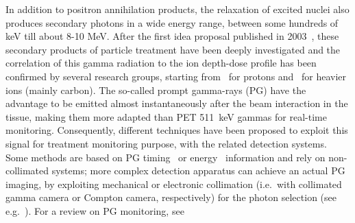 In addition to positron annihilation products, the relaxation of excited nuclei also produces secondary photons in a wide energy range, between some hundreds of keV till about 8-10 MeV. After the first idea proposal published in 2003~\cite{PG_first}, these secondary products of particle treatment have been deeply investigated and the correlation of this gamma radiation to the ion depth-dose profile has been confirmed by several research groups, starting from~\cite{Min_PG} for protons and~\cite{Testa_PG} for heavier ions (mainly carbon). The so-called prompt gamma-rays (PG) have the advantage to be emitted almost instantaneously after the beam interaction in the tissue, making them more adapted than PET 511~keV gammas for real-time monitoring. Consequently, different techniques have been proposed to exploit this signal for treatment monitoring purpose, with the related detection systems. Some methods are based on PG timing~\cite{Golnik:2014aa, Krimmer_PGPI} or energy~\cite{Verburg:2014aa} information and rely on non-collimated systems; more complex detection apparatus can achieve an actual PG imaging, by exploiting mechanical or electronic collimation (i.e.~with collimated gamma camera or Compton camera, respectively) for the photon selection (see e.g.~\cite{Min_PG, Bom_collimated, Smeets:2012aa, Roellinghoff_2014, Priegnitz:2015aa, Frandes_2010, LLOSA2012105, KORMOLL2011114, MCCLESKEY2015163, Matsuoka:2014qna, Peterson:2010aa, Solevi:2016aa, ALDAWOOD2017190}). For a review on PG monitoring, see~\cite{krimmer:hal-01585334}

